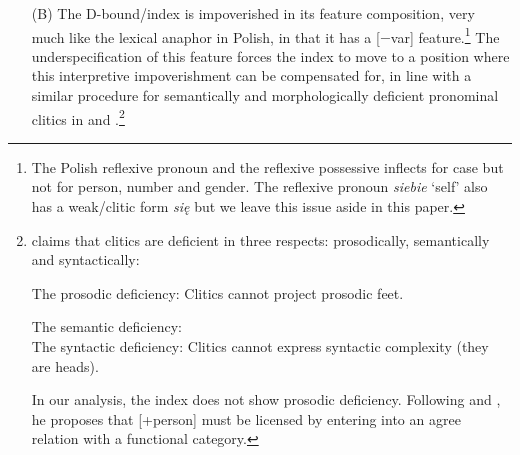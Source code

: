 \documentclass[output=paper,modfonts,nonflat
]{langsci/langscibook}
\begin{document}
\begin{itemize}
{\begin{itemize}
        \end{itemize} \label{ex:witkos:5d}}
    \z
    \z
    \item[(B)] The D-bound/index is impoverished in its feature composition, very much like the lexical anaphor in Polish, in that it has a [$-$var] feature.\footnote{\label{fn4}The Polish reflexive pronoun and the reflexive possessive inflects for case but not for person, number and gender. The reflexive pronoun \textit{siebie} ‘self’ also has a weak/clitic form \textit{się} but we leave this issue aside in this paper.} The underspecification of this feature forces the index to move to a position where this interpretive impoverishment can be compensated for, in line with a similar procedure for semantically and morphologically deficient pronominal clitics in \cite{bejar2003} and \cite{franks2017,franks2018}.\footnote{\label{fn6}\cite{franks2017,franks2018} claims that clitics are deficient in three respects: prosodically, semantically and syntactically:

\ea
The prosodic deficiency: Clitics cannot project prosodic feet. \citep[147]{franks2017}
\z

\ea
The semantic deficiency:\\
\z
\z
\ea
The syntactic deficiency: Clitics cannot express syntactic complexity (they are heads).
\z

\noindent In our analysis, the index does not show prosodic deficiency. Following \cite{cardinalettistarke1994} and \cite{bejar2003}, he proposes that [+person] must be licensed by entering into an agree relation with a functional category.}


\end{itemize}
\end{document}
